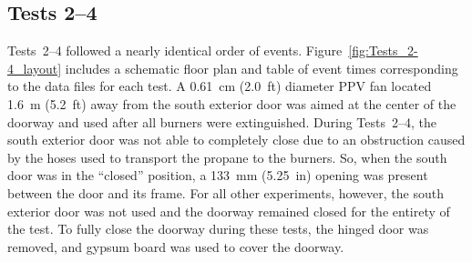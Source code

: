 \subsection{Tests 2--4}
Tests~2--4 followed a nearly identical order of events. Figure~\ref{fig:Tests_2-4_layout} includes a schematic floor plan and table of event times corresponding to the data files for each test. A 0.61~cm (2.0~ft) diameter PPV fan located 1.6~m (5.2~ft) away from the south exterior door was aimed at the center of the doorway and used after all burners were extinguished. During Tests~2--4, the south exterior door was not able to completely close due to an obstruction caused by the hoses used to transport the propane to the burners. So, when the south door was in the ``closed'' position, a 133~mm (5.25~in) opening was present between the door and its frame. For all other experiments, however, the south exterior door was not used and the doorway remained closed for the entirety of the test. To fully close the doorway during these tests, the hinged door was removed, and gypsum board was used to cover the doorway.

